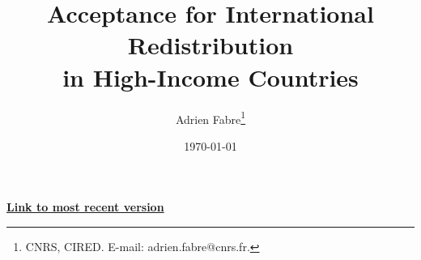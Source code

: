 \documentclass[12pt,english]{article}
\title{Acceptance for International Redistribution\\
in High-Income Countries
}
\author{Adrien Fabre\footnote{CNRS, CIRED. E-mail: adrien.fabre@cnrs.fr.}
} %
\date{\today} %
\begin{document}
\maketitle

\begin{center}
{\textbf{\href{https://github.com/bixiou/robustness_global_redistr/raw/main/papers/support_global_redistr.pdf}{Link to most recent version}}}
\end{center}



\end{document}
